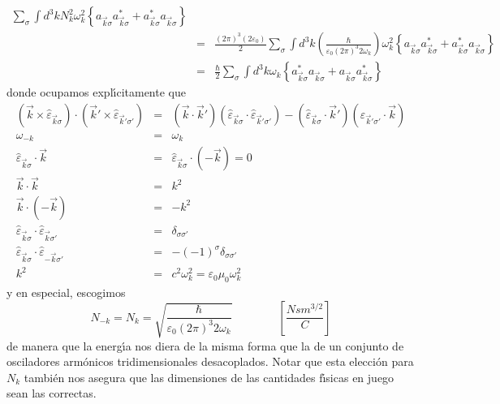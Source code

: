 \begin{eqnarray}
\sum_{\sigma}\int d^{3}kN_{k}^{2}\omega_{k}^{2}\left\{ a_{\vec{k}\sigma }a_{\vec{k}\sigma}^{\ast}+a_{\vec{k}\sigma}^{\ast}a_{\vec{k}\sigma}\right\} \nonumber\\ & = &\frac{\left( 2\pi\right) ^{3}\left( 2\varepsilon_{0}\right) }{2}%
\sum_{\sigma}\int d^{3}k\left( \frac{\hbar}{\varepsilon_{0}\left( 2\pi\right) ^{3}2\omega_{k}}\right) \omega_{k}^{2}\left\{ a_{\vec{k}\sigma }a_{\vec{k}\sigma}^{\ast}+a_{\vec{k}\sigma}^{\ast}a_{\vec{k}\sigma}\right\} \nonumber\\ & = &\frac{\hbar}{2}\sum_{\sigma}\int d^{3}k\omega_{k}\left\{ a_{\vec{k}\sigma }^{\ast}a_{\vec{k}\sigma}+a_{\vec{k}\sigma}a_{\vec{k}\sigma}^{\ast}\right\} \label{Energia Campo EM}%
\end{eqnarray} donde ocupamos expl\'{\i}citamente que \begin{eqnarray} \left( \vec{k}\times\hat{\varepsilon}_{\vec{k}\sigma}\right) \cdot\left( \vec{k} ' \times\hat{\varepsilon}_{\vec{k} ' \sigma ' }\right) & = &\left( \vec{k}\cdot\vec{k} ' \right) \left( \hat{\varepsilon}_{\vec{k}\sigma}\cdot\hat{\varepsilon}_{\vec{k} ' \sigma ' }\right) -\left( \hat{\varepsilon}_{\vec{k}\sigma}\cdot\vec{k} ' \right) \left( \hat{\varepsilon}_{\vec{k} ' \sigma ' }\cdot\vec{k}\right) \label{rel1}\\ \omega_{-k} & = &\omega_{k}\label{rel2}\\ \hat{\varepsilon}_{\vec{k}\sigma}\cdot\vec{k} & = &\hat{\varepsilon}_{\vec {k}\sigma}\cdot\left( -\vec{k}\right) =0\label{rel3}\\ \vec{k}\cdot\vec{k} & = &k^{2}\label{rel4}\\ \vec{k}\cdot\left( -\vec{k}\right) & = &-k^{2}\label{rel5}\\ \hat{\varepsilon}_{\vec{k}\sigma}\cdot\hat{\varepsilon}_{\vec{k}\sigma ' } & = &\delta_{\sigma\sigma ' }\label{rel6}\\ \hat{\varepsilon}_{\vec{k}\sigma}\cdot\hat{\varepsilon}_{-\vec{k}\sigma ' } & = &-\left( -1\right) ^{\sigma}\delta_{\sigma\sigma ' }\label{rel7}\\ k^{2} & = &c^{2}\omega_{k}^{2}=\varepsilon_{0}\mu_{0}\omega_{k}^{2}\label{rel8}%
\end{eqnarray} y en especial, escogimos \begin{equation} N_{-k}=N_{k}=\sqrt{\frac{\hbar}{\varepsilon_{0}\left( 2\pi\right) ^{3}2\omega_{k}}}\qquad\qquad\left[ \frac{Nsm^{3/2}}{C}\right] \label{rel9}%
\end{equation} de manera que la energ\'{\i}a nos diera de la misma forma que la de un conjunto de osciladores arm\'{o}nicos tridimensionales desacoplados. Notar que esta elecci\'{o}n para $N_{k}$ tambi\'{e}n nos asegura que las dimensiones de las cantidades f\'{\i}sicas en juego sean las correctas.

